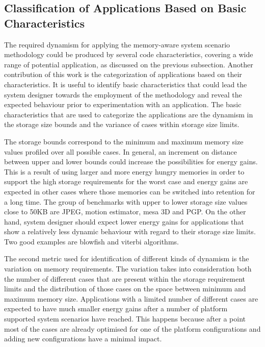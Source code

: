 \documentclass{acm_proc_article-sp}
\begin{document}
\subsection{Classification of Applications Based on Basic Characteristics}
\label{sec:categorisation}
The required dynamism for applying the memory-aware system scenario methodology could be produced by several code characteristics, covering a wide range of potential application, as discussed on the previous subsection. Another contribution of this work is the categorization of applications based on their characteristics. It is useful to identify basic characteristics that could lead the system designer towards the employment of the methodology and reveal the expected behaviour prior to experimentation with an application. The basic characteristics that are used to categorize the applications are the dynamism in the storage size bounds and the variance of cases within storage size limits.

The storage bounds correspond to the minimum and maximum memory size values profiled over all possible cases. In general, an increment on distance between upper and lower bounds could increase the possibilities for energy gains. This is a result of using larger and more energy hungry memories in order to support the high storage requirements for the worst case and energy gains are expected in other cases where those memories can be switched into retention for a long time. The group of benchmarks with upper to lower storage size values close to 50KB are JPEG, motion estimator, mesa 3D and PGP. On the other hand, system designer should expect lower energy gains for applications that show a relatively less dynamic behaviour with regard to their storage size limits. Two good examples are blowfish and viterbi algorithms. 

The second metric used for identification of different kinds of dynamism is the variation on memory requirements. The variation takes into consideration both the number of different cases that are present within the storage requirement limits and the distribution of those cases on the space between minimum and maximum memory size. Applications with a limited number of different cases are expected to have much smaller energy gains after a number of platform supported system scenarios have reached. This happens because after a point most of the cases are already optimised for one of the platform configurations and adding new configurations have a minimal impact.
\end{document}
